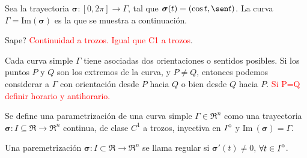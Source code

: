 \begin{example}
    Sea la trayectoria $\boldsymbol{\sigma}:[0,2\pi]\to\Gamma$, tal que $\boldsymbol{\sigma}(t)=(\cos t, \sen t)$. La curva $\Gamma=\text{Im}(\boldsymbol{\sigma})$ es la que se muestra a continuaci\'on.

    \begin{center}
    \end{center}
    
\end{example}

\begin{definition}
    Sape? \textcolor{red}{Continuidad a trozos. Igual que C1 a trozos}.\final
\end{definition}

Cada curva simple $\Gamma$ tiene asociadas dos orientaciones o sentidos posibles. Si los puntos $P$ y $Q$ son los extremos de la curva, y $P\neq Q$, entonces podemos considerar a $\Gamma$ con orientaci\'on desde $P$ hacia $Q$ o bien desde $Q$ hacia $P$. \textcolor{red}{Si P=Q definir horario y antihorario.}

\begin{definition}
    Se define una parametrizaci\'on de una curva simple $\Gamma\in\Re^n$ como una trayectoria $\boldsymbol{\sigma}:I\subseteq\Re\to\Re^n$ continua, de clase $C^1$ a trozos, inyectiva en ${\kern0ptI}^{\mathrm{o}}$ y $\text{Im}\:(\boldsymbol{\sigma})=\Gamma$.\final
\end{definition}

\begin{definition}
    Una paremetrizaci\'on $\boldsymbol{\sigma}:I\subset\Re\to\Re^n$ se llama regular si $\boldsymbol{\sigma}'(t)\neq0$, $\forall t\in{\kern0ptI}^{\mathrm{o}}$.\final
\end{definition}